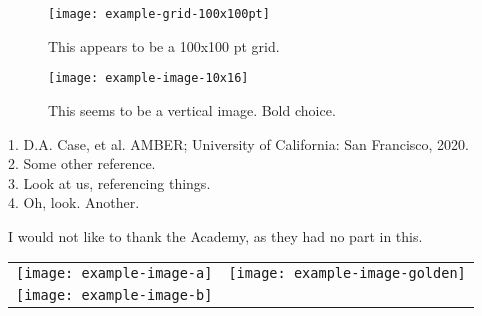 \documentclass[20pt]{beamer}
\newlength{\sepwidth}
\newlength{\colwidth}
\newcommand{\separatorcolumn}{\begin{column}{\sepwidth}\end{column}}
\begin{document}
\begin{frame}[t]
\begin{columns}[t]
\begin{column}{\colwidth}
\begin{tcolorbox}[title=Etwas Anderes, every float=\centering]
\begin{figure}[htb]
\centering
\texttt{[image: example-grid-100x100pt]}
\caption{This appears to be a 100x100 pt grid.}
\end{figure}

\begin{figure}[htb]
\centering
\texttt{[image: example-image-10x16]}
\caption{This seems to be a vertical image. Bold choice.}
\end{figure}

\end{tcolorbox}


\begin{tcolorbox}[title=References, fonttitle=\bfseries\small]
\small
1. D.A. Case, et al. AMBER; University of California: San Francisco, 2020. \\
2. Some other reference. \\
3. Look at us, referencing things. \\
4. Oh, look. Another.
\end{tcolorbox}

\vspace{0.15in}

\begin{tcolorbox}[title=Acknowledgements, fonttitle=\bfseries\small]
\small I would not like to thank the Academy, as they had no part in this. \\[1ex]

\begin{center}
\begin{tabular}{ m{0.3\colwidth} m{0.3\colwidth} }
\texttt{[image: example-image-a]} & \texttt{[image: example-image-golden]} \\
\texttt{[image: example-image-b]} & \\
\end{tabular}
\end{center}

\end{tcolorbox}

\end{column}
\separatorcolumn
\end{columns}

\end{frame}
\end{document}
